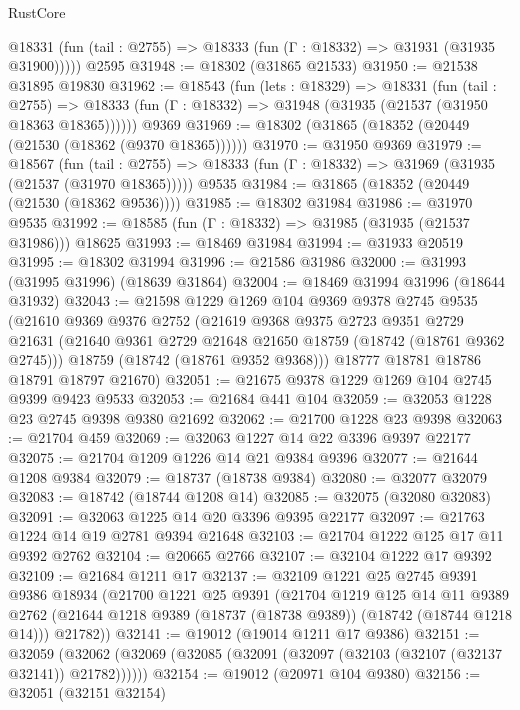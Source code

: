 \begin{lexlean}{RustCore}
\begin{coremodule}
      @18331 (fun (tail : @2755) => @18333 (fun (Γ : @18332) => @31931 (@31935 @31900)))))
    @2595
@31948 := @18302 (@31865 @21533)
@31950 := @21538 @31895 @19830
@31962 := @18543
    (fun (lets : @18329) =>
    @18331
      (fun (tail : @2755) =>
      @18333 (fun (Γ : @18332) => @31948 (@31935 (@21537 (@31950 @18363 @18365))))))
    @9369
@31969 := @18302 (@31865 (@18352 (@20449 (@21530 (@18362 (@9370 @18365))))))
@31970 := @31950 @9369
@31979 := @18567
    (fun (tail : @2755) => @18333 (fun (Γ : @18332) => @31969 (@31935 (@21537 (@31970 @18365)))))
    @9535
@31984 := @31865 (@18352 (@20449 (@21530 (@18362 @9536))))
@31985 := @18302 @31984
@31986 := @31970 @9535
@31992 := @18585 (fun (Γ : @18332) => @31985 (@31935 (@21537 @31986))) @18625
@31993 := @18469 @31984
@31994 := @31933 @20519
@31995 := @18302 @31994
@31996 := @21586 @31986
@32000 := @31993 (@31995 @31996) (@18639 @31864)
@32004 := @18469 @31994 @31996 (@18644 @31932)
@32043 := @21598
    @1229
    @1269
    @104
    @9369
    @9378
    @2745
    @9535
    (@21610
      @9369
      @9376
      @2752
      (@21619
        @9368
        @9375
        @2723
        @9351
        @2729
        @21631
        (@21640 @9361 @2729 @21648 @21650 @18759 (@18742 (@18761 @9362 @2745)))
        @18759
        (@18742 (@18761 @9352 @9368)))
      @18777
      @18781
      @18786
      @18791
      @18797
      @21670)
@32051 := @21675 @9378 @1229 @1269 @104 @2745 @9399 @9423 @9533
@32053 := @21684 @441 @104
@32059 := @32053 @1228 @23 @2745 @9398 @9380 @21692
@32062 := @21700 @1228 @23 @9398
@32063 := @21704 @459
@32069 := @32063 @1227 @14 @22 @3396 @9397 @22177
@32075 := @21704 @1209 @1226 @14 @21 @9384 @9396
@32077 := @21644 @1208 @9384
@32079 := @18737 (@18738 @9384)
@32080 := @32077 @32079
@32083 := @18742 (@18744 @1208 @14)
@32085 := @32075 (@32080 @32083)
@32091 := @32063 @1225 @14 @20 @3396 @9395 @22177
@32097 := @21763 @1224 @14 @19 @2781 @9394 @21648
@32103 := @21704 @1222 @125 @17 @11 @9392 @2762
@32104 := @20665 @2766
@32107 := @32104 @1222 @17 @9392
@32109 := @21684 @1211 @17
@32137 := @32109
    @1221
    @25
    @2745
    @9391
    @9386
    @18934
    (@21700
      @1221
      @25
      @9391
      (@21704
        @1219
        @125
        @14
        @11
        @9389
        @2762
        (@21644 @1218 @9389 (@18737 (@18738 @9389)) (@18742 (@18744 @1218 @14)))
        @21782))
@32141 := @19012 (@19014 @1211 @17 @9386)
@32151 := @32059
    (@32062 (@32069 (@32085 (@32091 (@32097 (@32103 (@32107 (@32137 @32141)) @21782))))))
@32154 := @19012 (@20971 @104 @9380)
@32156 := @32051 (@32151 @32154)

\end{coremodule}
\end{lexlean}
